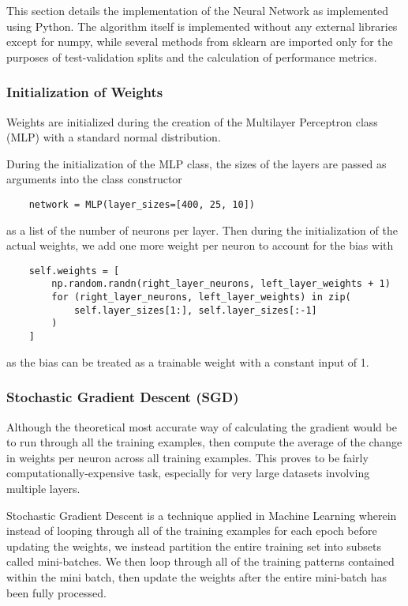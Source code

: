 \documentclass{article} %
\theoremstyle{definition}
\theoremstyle{remark}
\theoremstyle{plain}
\begin{document}
This section details the implementation of the Neural Network as implemented using Python. The algorithm itself is implemented without any external libraries except for numpy, while several methods from sklearn are imported only for the purposes of test-validation splits and the calculation of performance metrics.

\subsubsection{Initialization of Weights}
Weights are initialized during the creation of the Multilayer Perceptron class (MLP) with a standard normal distribution.

During the initialization of the MLP class, the sizes of the layers are passed as arguments into the class constructor 
\begin{verbatim}
    network = MLP(layer_sizes=[400, 25, 10])
\end{verbatim}
as a list of the number of neurons per layer. Then during the initialization of the actual weights, we add one more weight per neuron to account for the bias with
\begin{verbatim}
    self.weights = [
        np.random.randn(right_layer_neurons, left_layer_weights + 1)
        for (right_layer_neurons, left_layer_weights) in zip(
            self.layer_sizes[1:], self.layer_sizes[:-1]
        )
    ]
\end{verbatim}
as the bias can be treated as a trainable weight with a constant input of 1.

\subsubsection{Stochastic Gradient Descent (SGD)}
Although the theoretical most accurate way of calculating the gradient would be to run through all the training examples, then compute the average of the change in weights per neuron across all training examples. This proves to be fairly computationally-expensive task, especially for very large datasets involving multiple layers.

Stochastic Gradient Descent is a technique applied in Machine Learning wherein instead of looping through all of the training examples for each epoch before updating the weights, we instead partition the entire training set into subsets called mini-batches. We then loop through all of the training patterns contained within the mini batch, then update the weights after the entire mini-batch has been fully processed.
\end{document}
